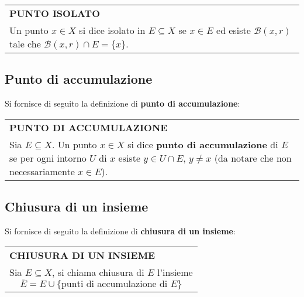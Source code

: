 \documentclass[a4paper]{extarticle}
\renewcommand\arraystretch{}
\begin{document}
\vspace{1em}
\setlength{\tabcolsep}{14pt}
\renewcommand{\arraystretch}{2}
\noindent
\begin{tabularx}{\textwidth}{@{}|P|@{}}
    \hline
    {\textbf{PUNTO ISOLATO}}\\
    \parbox{\linewidth}{Un punto $x \in X$ si dice isolato in $E \subseteq X$ se $x \in E$ ed esiste $\mathcal{B}(x,r)$ tale che $\mathcal{B}(x,r) \cap E = \{x\}$. \vspace{1mm}}\\
    \hline
\end{tabularx}

\vspace{1em}
\noindent
\subsection{Punto di accumulazione}
Si fornisce di seguito la definizione di \textbf{punto di accumulazione}:

\vspace{1em}
\setlength{\tabcolsep}{14pt}
\renewcommand{\arraystretch}{2}
\noindent
\begin{tabularx}{\textwidth}{@{}|P|@{}}
    \hline
    {\textbf{PUNTO DI ACCUMULAZIONE}}\\
    \parbox{\linewidth}{Sia $E \subseteq X$. Un punto $x \in X$ si dice \textbf{punto di accumulazione} di $E$ se per ogni intorno $U$ di $x$ esiste $y \in U \cap E$, $y \neq x$ (da notare che non necessariamente $x \in E$). \vspace{3mm}}\\
    \hline
\end{tabularx}

\newpage
\noindent
\subsection{Chiusura di un insieme}
Si fornisce di seguito la definizione di \textbf{chiusura di un insieme}:

\vspace{1em}
\setlength{\tabcolsep}{14pt}
\renewcommand{\arraystretch}{2}
\noindent
\begin{tabularx}{\textwidth}{@{}|P|@{}}
    \hline
    {\textbf{CHIUSURA DI UN INSIEME}}\\
    \parbox{\linewidth}{Sia $E \subseteq X$, si chiama chiusura di $E$ l'insieme
    \[\overline{E} = E \cup \{\text{punti di accumulazione di } E\}\]
    \vspace{-2mm}}\\
    \hline
\end{tabularx}
\end{document}
